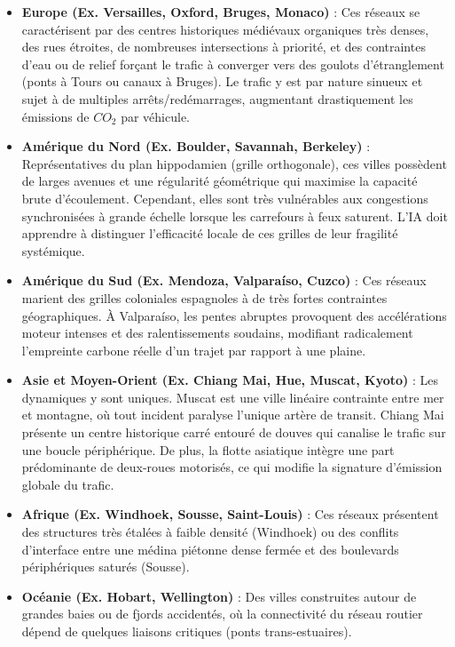 \documentclass[10pt, a4paper]{article}
\providecommand{\tightlist}{}
\begin{document}
\begin{itemize}
\tightlist
\item
  \textbf{Europe (Ex. Versailles, Oxford, Bruges, Monaco)} : Ces réseaux
  se caractérisent par des centres historiques médiévaux organiques très
  denses, des rues étroites, de nombreuses intersections à priorité, et
  des contraintes d'eau ou de relief forçant le trafic à converger vers
  des goulots d'étranglement (ponts à Tours ou canaux à Bruges). Le
  trafic y est par nature sinueux et sujet à de multiples
  arrêts/redémarrages, augmentant drastiquement les émissions de
  \(CO_2\) par véhicule.
\item
  \textbf{Amérique du Nord (Ex. Boulder, Savannah, Berkeley)} :
  Représentatives du plan hippodamien (grille orthogonale), ces villes
  possèdent de larges avenues et une régularité géométrique qui maximise
  la capacité brute d'écoulement. Cependant, elles sont très vulnérables
  aux congestions synchronisées à grande échelle lorsque les carrefours
  à feux saturent. L'IA doit apprendre à distinguer l'efficacité locale
  de ces grilles de leur fragilité systémique.
\item
  \textbf{Amérique du Sud (Ex. Mendoza, Valparaíso, Cuzco)} : Ces
  réseaux marient des grilles coloniales espagnoles à de très fortes
  contraintes géographiques. À Valparaíso, les pentes abruptes
  provoquent des accélérations moteur intenses et des ralentissements
  soudains, modifiant radicalement l'empreinte carbone réelle d'un
  trajet par rapport à une plaine.
\item
  \textbf{Asie et Moyen-Orient (Ex. Chiang Mai, Hue, Muscat, Kyoto)} :
  Les dynamiques y sont uniques. Muscat est une ville linéaire
  contrainte entre mer et montagne, où tout incident paralyse l'unique
  artère de transit. Chiang Mai présente un centre historique carré
  entouré de douves qui canalise le trafic sur une boucle périphérique.
  De plus, la flotte asiatique intègre une part prédominante de
  deux-roues motorisés, ce qui modifie la signature d'émission globale
  du trafic.
\item
  \textbf{Afrique (Ex. Windhoek, Sousse, Saint-Louis)} : Ces réseaux
  présentent des structures très étalées à faible densité (Windhoek) ou
  des conflits d'interface entre une médina piétonne dense fermée et des
  boulevards périphériques saturés (Sousse).
\item
  \textbf{Océanie (Ex. Hobart, Wellington)} : Des villes construites
  autour de grandes baies ou de fjords accidentés, où la connectivité du
  réseau routier dépend de quelques liaisons critiques (ponts
  trans-estuaires).
\end{itemize}
\end{document}
